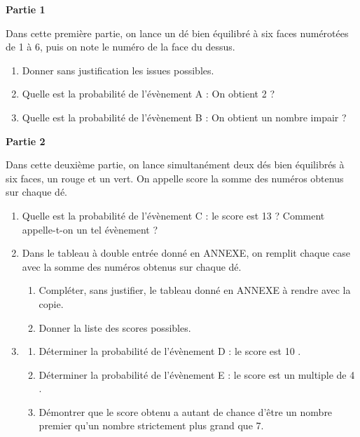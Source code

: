 \documentclass[exercice,a4]{thedocument}%
\begin{document}
%

\textbf{Partie 1}

\medskip
Dans cette première partie, on lance un dé bien équilibré à six faces numérotées de 1 à 6, puis on note le numéro de la face du dessus.

	\begin{enumerate}
		\item Donner sans justification les issues possibles.

		\item Quelle est la probabilité de l'évènement A : \og On obtient 2 \fg{} ?

		\item Quelle est la probabilité de l'évènement B : \og On obtient un nombre impair \fg{} ?
	\end{enumerate}

	\textbf{Partie 2}

\medskip

Dans cette deuxième partie, on lance simultanément deux dés bien équilibrés à six faces, un rouge et un vert. On appelle \og score \fg{} la somme des numéros obtenus sur chaque dé.

	\begin{enumerate}
		\item Quelle est la probabilité de l'évènement C : \og le score est 13 \fg{} ? Comment appelle-t-on un tel évènement ?

		\item Dans le tableau à double entrée donné en ANNEXE, on remplit chaque case avec la somme des numéros obtenus sur chaque dé.

		\begin{enumerate}
			\item Compléter, sans justifier, le tableau donné en ANNEXE à rendre avec la copie.

			\item Donner la liste des scores possibles.
		\end{enumerate}

		\item \begin{enumerate}
			\item Déterminer la probabilité de l'évènement D : \og le score est 10 \fg.

			\item Déterminer la probabilité de l'évènement E : \og le score est un multiple de 4 \fg.

			\item Démontrer que le score obtenu a autant de chance d'être un nombre premier qu'un nombre strictement plus grand que 7.
		\end{enumerate}
	\end{enumerate}
\end{document}
